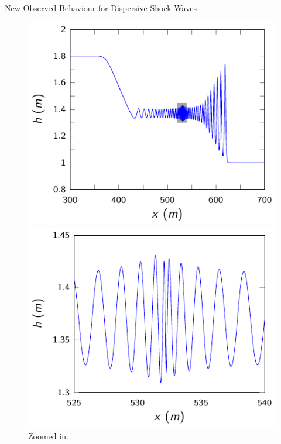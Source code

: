 \documentclass[pdf]{beamer}
\begin{document}
\begin{frame}{New Observed Behaviour for Dispersive Shock Waves}
	
	\begin{figure}
		\centering
		\begin{minipage}{.5\textwidth}
			\centering
			\includegraphics[width=1\linewidth]{./Pictures/DSW/DSWN2.pdf}
			\caption{New observed structure.}
		\end{minipage}%
		\pause
		\begin{minipage}{.5\textwidth}
			\centering
			\includegraphics[width=1\linewidth]{./Pictures/DSW/DSWNz.pdf}
			\caption{Zoomed in.}
		\end{minipage}
	\end{figure}
\end{frame}
\end{document}
